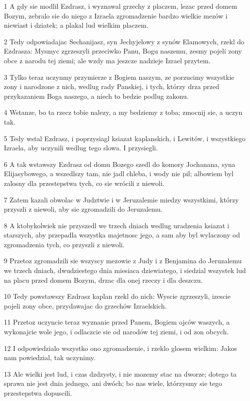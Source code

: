 \par 1 A gdy sie modlil Ezdrasz, i wyznawal grzechy z placzem, lezac przed domem Bozym, zebralo sie do niego z Izraela zgromadzenie bardzo wielkie mezów i niewiast i dziatek; a plakal lud wielkim placzem.
\par 2 Tedy odpowiadajac Sechanijasz, syn Jechyjelowy z synów Elamowych, rzekl do Ezdrasza: Mysmyc zgrzeszyli przeciwko Panu, Bogu naszemu, zesmy pojeli zony obce z narodu tej ziemi; ale wzdy ma jeszcze nadzieje Izrael przytem.
\par 3 Tylko teraz uczynmy przymierze z Bogiem naszym, ze porzucimy wszystkie zony i narodzone z nich, wedlug rady Panskiej, i tych, którzy drza przed przykazaniem Boga naszego, a niech to bedzie podlug zakonu.
\par 4 Wstanze, bo ta rzecz tobie nalezy, a my bedziemy z toba; zmocnij sie, a uczyn tak.
\par 5 Tedy wstal Ezdrasz, i poprzysiagl ksiazat kaplanskich, i Lewitów, i wszystkiego Izraela, aby uczynili wedlug tego slowa. I przysiegli.
\par 6 A tak wstawszy Ezdrasz od domu Bozego szedl do komory Jochanana, syna Elijasybowego, a wszedlszy tam, nie jadl chleba, i wody nie pil; albowiem byl zalosny dla przestepstwa tych, co sie wrócili z niewoli.
\par 7 Zatem kazali obwolac w Judztwie i w Jeruzalemie miedzy wszystkimi, którzy przyszli z niewoli, aby sie zgromadzili do Jeruzalemu.
\par 8 A ktobykolwiek nie przyszedl we trzech dniach wedlug uradzenia ksiazat i starszych, aby przepadla wszystka majetnosc jego, a sam aby byl wylaczony od zgromadzenia tych, co przyszli z niewoli.
\par 9 Przetoz zgromadzili sie wszyscy mezowie z Judy i z Benjamina do Jeruzalemu we trzech dniach, dwudziestego dnia miesiaca dziewiatego, i siedzial wszystek lud na placu przed domem Bozym, drzac dla onej rzeczy i dla deszczu.
\par 10 Tedy powstawszy Ezdrasz kaplan rzekl do nich: Wyscie zgrzeszyli, izescie pojeli zony obce, przydawajac do grzechów Izraelskich.
\par 11 Przetoz uczyncie teraz wyznanie przed Panem, Bogiem ojców waszych, a wykonajcie wole jego, i odlaczcie sie od narodów tej ziemi, i od zon obcych.
\par 12 I odpowiedzialo wszystko ono zgromadzenie, i rzeklo glosem wielkim: Jakos nam powiedzial, tak uczynimy.
\par 13 Ale wielki jest lud, i czas dzdzysty, i nie mozemy stac na dworze; dotego ta sprawa nie jest dnia jednego, ani dwóch; bo nas wiele, którzysmy sie tego przestepstwa dopuscili.
